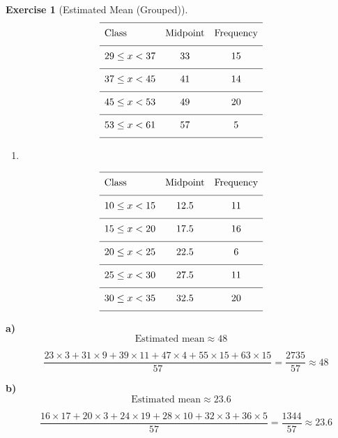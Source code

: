 \documentclass[
  letterpaper,
  DIV=11,
  numbers=noendperiod]{scrreprt}
\providecommand{\tightlist}{%
  \setlength{\itemsep}{0pt}\setlength{\parskip}{0pt}}
\theoremstyle{definition}
\newtheorem{exercise}{Exercise}[chapter]
\theoremstyle{remark}
\begin{document}
\begin{exercise}[Estimated Mean
(Grouped)]
\[{\renewcommand{\arraystretch}{1.6}\begin{array}{lcc}
\hline \text{Class} & \text{Midpoint} & \text{Frequency} \\[4pt]
\hline 29 \leq x < 37  & 33 & 15 \\[4pt]
\hline 37 \leq x < 45  & 41 & 14 \\[4pt]
\hline 45 \leq x < 53  & 49 & 20 \\[4pt]
\hline 53 \leq x < 61  & 57 & 5 \\[4pt]
\hline \end{array}}\]

\begin{enumerate}
\def\labelenumi{\alph{enumi})}
\setcounter{enumi}{3}
\tightlist
\item
\end{enumerate}

\[{\renewcommand{\arraystretch}{1.6}\begin{array}{lcc}
\hline \text{Class} & \text{Midpoint} & \text{Frequency} \\[4pt]
\hline 10 \leq x < 15  & 12.5 & 11 \\[4pt]
\hline 15 \leq x < 20  & 17.5 & 16 \\[4pt]
\hline 20 \leq x < 25  & 22.5 & 6 \\[4pt]
\hline 25 \leq x < 30  & 27.5 & 11 \\[4pt]
\hline 30 \leq x < 35  & 32.5 & 20 \\[4pt]
\hline \end{array}}\]

\begin{tcolorbox}[enhanced jigsaw, opacitybacktitle=0.6, coltitle=black, arc=.35mm, colframe=quarto-callout-tip-color-frame, colback=white, bottomrule=.15mm, left=2mm, colbacktitle=quarto-callout-tip-color!10!white, titlerule=0mm, opacityback=0, title=\textcolor{quarto-callout-tip-color}{\faLightbulb}\hspace{0.5em}{🔍 View Solution}, leftrule=.75mm, breakable, rightrule=.15mm, bottomtitle=1mm, toptitle=1mm, toprule=.15mm]

\textbf{a)} \[\text{Estimated mean} \approx 48\]

\[\quad \frac{23\times3+31\times9+39\times11+47\times4+55\times15+63\times15}{57}= \frac{2735}{57} \approx 48\]

\textbf{b)} \[\text{Estimated mean} \approx 23.6\]

\[\quad \frac{16\times17+20\times3+24\times19+28\times10+32\times3+36\times5}{57}= \frac{1344}{57} \approx 23.6\]


\end{tcolorbox}
\end{exercise}
\end{document}
